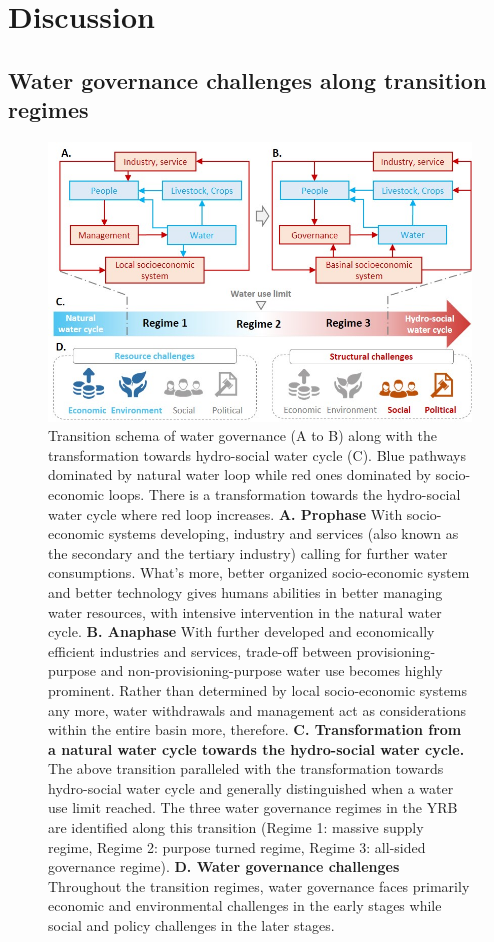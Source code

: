 \documentclass[9pt, twocolumn, twoside, lineno]{pnas-new}
\begin{document}
\section*{Discussion}
\label{Discussion}

\subsection*{Water governance challenges along transition regimes}

\begin{figure}[htbp!]
	\centering
	\includegraphics[width=0.8\linewidth]{../../figures/main/transition.jpg}
	\caption{
		Transition schema of water governance (A to B) along with the transformation towards hydro-social water cycle (C). Blue pathways dominated by natural water loop while red ones dominated by socio-economic loops. There is a transformation towards the hydro-social water cycle where red loop increases.
		\textbf{A. Prophase} With socio-economic systems developing, industry and services (also known as the secondary and the tertiary industry) calling for further water consumptions. What's more, better organized socio-economic system and better technology gives humans abilities in better managing water resources, with intensive intervention in the natural water cycle. 
		\textbf{B. Anaphase} With further developed and economically efficient industries and services, trade-off between provisioning-purpose and non-provisioning-purpose water use becomes highly prominent. Rather than determined by local socio-economic systems any more, water withdrawals and management act as considerations within the entire basin more, therefore. 
		\textbf{C. Transformation from a natural water cycle towards the hydro-social water cycle.} The above transition paralleled with the transformation towards hydro-social water cycle and generally distinguished when a water use limit reached. The three water governance regimes in the YRB are identified along this transition (Regime 1: massive supply regime, Regime 2: purpose turned regime, Regime 3: all-sided governance regime).
		\textbf{D. Water governance challenges} Throughout the transition regimes, water governance faces primarily economic and environmental challenges in the early stages while social and policy challenges in the later stages.
	}
	\label{fig:summary}
\end{figure}
\end{document}
